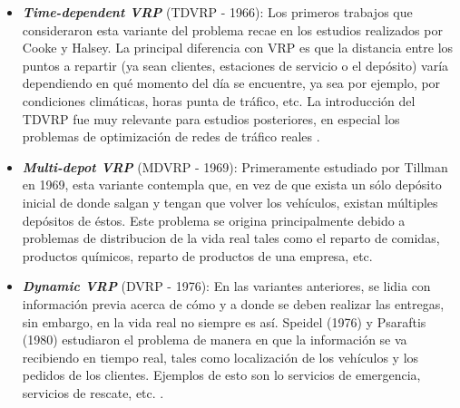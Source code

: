 \documentclass[letter, 10pt]{article}
\begin{document}
\begin{itemize}
    \item \textbf{\emph{Time-dependent VRP}} (TDVRP - 1966): Los primeros trabajos que consideraron esta variante del problema recae en los estudios realizados por Cooke y Halsey. La principal diferencia con VRP es que la distancia entre los puntos a repartir (ya sean clientes, estaciones de  servicio o el depósito) varía dependiendo en qué momento del día se encuentre, ya sea por ejemplo, por condiciones climáticas, horas punta de tráfico, etc. La introducción del TDVRP fue muy relevante para estudios posteriores, en especial los problemas de optimización de redes de tráfico reales  \cite{Cooke1966TheSR}.

    \item \textbf{\emph{Multi-depot VRP}} (MDVRP - 1969): Primeramente estudiado por Tillman en 1969, esta variante contempla que, en vez de que exista un sólo depósito inicial de donde salgan y tengan que volver los vehículos, existan múltiples depósitos de éstos. Este problema se origina principalmente debido a problemas de distribucion de la vida real tales como el reparto de comidas, productos químicos, reparto de productos de una empresa, etc. \cite{doi:10.1287/trsc.3.3.192}
    
    
    \item \textbf{\emph{Dynamic VRP}} (DVRP - 1976): En las variantes anteriores, se lidia con información previa acerca de cómo y a donde se deben realizar las entregas, sin embargo, en la vida real no siempre es así. Speidel (1976) y Psaraftis (1980) estudiaron el problema de manera en que la información se va recibiendo en tiempo real, tales como localización de los vehículos y los pedidos de los clientes. Ejemplos de esto son lo servicios de emergencia, servicios de rescate, etc.  \cite{Speidel1976EDPASSISTEDFS} \cite{doi:10.1287/trsc.14.2.130}.
    

\end{itemize}
\end{document}

